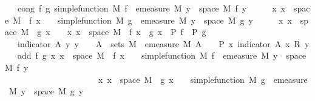\begin{isabellebody}
\ \ \ cong{\isacharcolon}{\kern0pt}\ {\isachardoublequoteopen}{\isasymAnd}f\ g{\isachardot}{\kern0pt}\ simple{\isacharunderscore}{\kern0pt}function\ M\ f\ {\isasymLongrightarrow}\ emeasure\ M\ {\isacharbraceleft}{\kern0pt}y\ {\isasymin}\ space\ M{\isachardot}{\kern0pt}\ f\ y\ {\isasymnoteq}\ {}{\isacharbraceright}{\kern0pt}\ {\isasymnoteq}\ {\isasyminfinity}\ {\isasymLongrightarrow}\ {\isacharparenleft}{\kern0pt}{\isasymAnd}x{\isachardot}{\kern0pt}\ x\ {\isasymin}\ space\ M\ {\isasymLongrightarrow}\ f\ x\ {\isasymge}\ {}{\isacharparenright}{\kern0pt}\ {\isasymLongrightarrow}\ simple{\isacharunderscore}{\kern0pt}function\ M\ g\ {\isasymLongrightarrow}\ emeasure\ M\ {\isacharbraceleft}{\kern0pt}y\ {\isasymin}\ space\ M{\isachardot}{\kern0pt}\ g\ y\ {\isasymnoteq}\ {}{\isacharbraceright}{\kern0pt}\ {\isasymnoteq}\ {\isasyminfinity}\ {\isasymLongrightarrow}\ {\isacharparenleft}{\kern0pt}{\isasymAnd}x{\isachardot}{\kern0pt}\ x\ {\isasymin}\ space\ M\ {\isasymLongrightarrow}\ g\ x\ {\isasymge}\ {}{\isacharparenright}{\kern0pt}\ {\isasymLongrightarrow}\ {\isacharparenleft}{\kern0pt}{\isasymAnd}x{\isachardot}{\kern0pt}\ x\ {\isasymin}\ space\ M\ {\isasymLongrightarrow}\ f\ x\ {\isacharequal}{\kern0pt}\ g\ x{\isacharparenright}{\kern0pt}\ {\isasymLongrightarrow}\ P\ f\ {\isasymLongrightarrow}\ P\ g{\isachardoublequoteclose}\isanewline
\ \ \ indicator{\isacharcolon}{\kern0pt}\ {\isachardoublequoteopen}{\isasymAnd}A\ y{\isachardot}{\kern0pt}\ y\ {\isasymge}\ {}\ {\isasymLongrightarrow}\ A\ {\isasymin}\ sets\ M\ {\isasymLongrightarrow}\ emeasure\ M\ A\ {\isacharless}{\kern0pt}\ {\isasyminfinity}\ {\isasymLongrightarrow}\ P\ {\isacharparenleft}{\kern0pt}{\isasymlambda}x{\isachardot}{\kern0pt}\ indicator\ A\ x\ {\isacharasterisk}{\kern0pt}\isactrlsub R\ y{\isacharparenright}{\kern0pt}{\isachardoublequoteclose}\isanewline
\ \ \ add{\isacharcolon}{\kern0pt}\ {\isachardoublequoteopen}{\isasymAnd}f\ g{\isachardot}{\kern0pt}\ {\isacharparenleft}{\kern0pt}{\isasymAnd}x{\isachardot}{\kern0pt}\ x\ {\isasymin}\ space\ M\ {\isasymLongrightarrow}\ f\ x\ {\isasymge}\ {}{\isacharparenright}{\kern0pt}\ {\isasymLongrightarrow}\ simple{\isacharunderscore}{\kern0pt}function\ M\ f\ {\isasymLongrightarrow}\ emeasure\ M\ {\isacharbraceleft}{\kern0pt}y\ {\isasymin}\ space\ M{\isachardot}{\kern0pt}\ f\ y\ {\isasymnoteq}\ {}{\isacharbraceright}{\kern0pt}\ {\isasymnoteq}\ {\isasyminfinity}\ {\isasymLongrightarrow}\ \isanewline
\ \ \ \ \ \ \ \ \ \ \ \ \ \ \ \ \ \ \ \ \ \ {\isacharparenleft}{\kern0pt}{\isasymAnd}x{\isachardot}{\kern0pt}\ x\ {\isasymin}\ space\ M\ {\isasymLongrightarrow}\ g\ x\ {\isasymge}\ {}{\isacharparenright}{\kern0pt}\ {\isasymLongrightarrow}\ simple{\isacharunderscore}{\kern0pt}function\ M\ g\ {\isasymLongrightarrow}\ emeasure\ M\ {\isacharbraceleft}{\kern0pt}y\ {\isasymin}\ space\ M{\isachardot}{\kern0pt}\ g\ y\ {\isasymnoteq}\ {}{\isacharbraceright}{\kern0pt}\ {\isasymnoteq}\ {\isasyminfinity}\ {\isasymLongrightarrow}\ \isanewline

\end{isabellebody}
